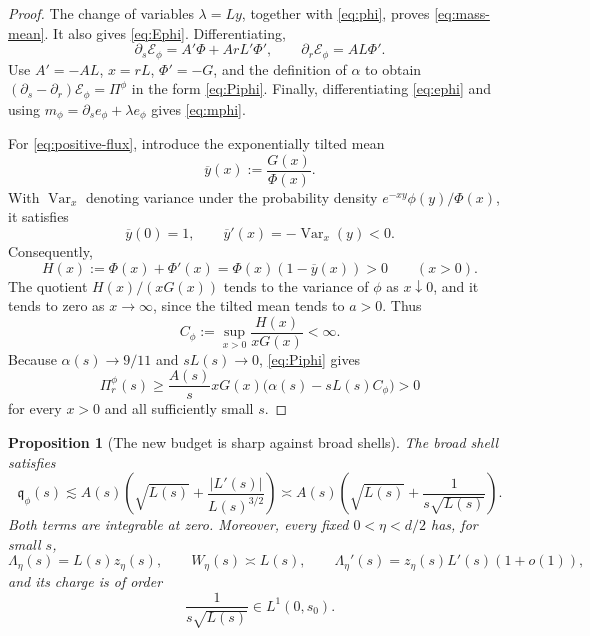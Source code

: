\documentclass[11pt]{article}
\newtheorem{proposition}[theorem]{Proposition}
\theoremstyle{remark}
\begin{document}
\begin{proof}
The change of variables \(\lambda=Ly\), together with
\eqref{eq:phi}, proves \eqref{eq:mass-mean}.  It also gives
\eqref{eq:Ephi}.  Differentiating,
\[
 \partial_s\mathcal E_\phi=A'\Phi+ArL'\Phi',
 \qquad
 \partial_r\mathcal E_\phi=AL\Phi'.
\]
Use \(A'=-AL\), \(x=rL\), \(\Phi'=-G\), and the definition of
\(\alpha\) to obtain
\((\partial_s-\partial_r)\mathcal E_\phi=\Pi^\phi\) in the form
\eqref{eq:Piphi}.  Finally, differentiating \eqref{eq:ephi} and using
\(m_\phi=\partial_se_\phi+\lambda e_\phi\) gives
\eqref{eq:mphi}.

For \eqref{eq:positive-flux}, introduce the exponentially tilted mean
\begin{equation}
\label{eq:tilted-mean}
 \overline y(x):=\frac{G(x)}{\Phi(x)}.
\end{equation}
With \(\operatorname{Var}_x\) denoting variance under the probability
density \(e^{-xy}\phi(y)/\Phi(x)\), it satisfies
\begin{equation}
\label{eq:tilted-variance}
 \overline y(0)=1,
 \qquad
 \overline y'(x)=-\operatorname{Var}_x(y)<0.
\end{equation}
Consequently,
\begin{equation}
\label{eq:H-positive}
 H(x):=\Phi(x)+\Phi'(x)
 =\Phi(x)(1-\overline y(x))>0
 \qquad(x>0).
\end{equation}
The quotient \(H(x)/(xG(x))\) tends to the variance of \(\phi\) as
\(x\downarrow0\), and it tends to zero as \(x\to\infty\), since the
tilted mean tends to \(a>0\).  Thus
\begin{equation}
\label{eq:Cphi}
 C_\phi:=\sup_{x>0}\frac{H(x)}{xG(x)}<\infty.
\end{equation}
Because \(\alpha(s)\to9/11\) and \(sL(s)\to0\),
\eqref{eq:Piphi} gives
\[
 \Pi^\phi_r(s)
 \ge
 \frac{A(s)}s xG(x)
 \bigl(\alpha(s)-sL(s)C_\phi\bigr)>0
\]
for every \(x>0\) and all sufficiently small \(s\).
\end{proof}

\begin{proposition}[The new budget is sharp against broad shells]
\label{prop:sharp}
The broad shell satisfies
\begin{equation}
\label{eq:qphi}
 \mathfrak q_\phi(s)
 \lesssim
 A(s)\left(
 \sqrt{L(s)}
 +\frac{|L'(s)|}{L(s)^{3/2}}
 \right)
 \asymp
 A(s)\left(
 \sqrt{L(s)}
 +\frac1{s\sqrt{L(s)}}
 \right).
\end{equation}
Both terms are integrable at zero.  Moreover, every fixed
\(0<\eta<d/2\) has, for small \(s\),
\begin{equation}
\label{eq:broad-quantile}
 \Lambda_\eta(s)=L(s)z_\eta(s),
 \qquad
 W_\eta(s)\asymp L(s),
 \qquad
 \Lambda_\eta'(s)=z_\eta(s)L'(s)(1+o(1)),
\end{equation}
and its charge is of order
\begin{equation}
\label{eq:broad-charge}
 \frac1{s\sqrt{L(s)}}\in L^1(0,s_0).
\end{equation}
\end{proposition}
\end{document}
